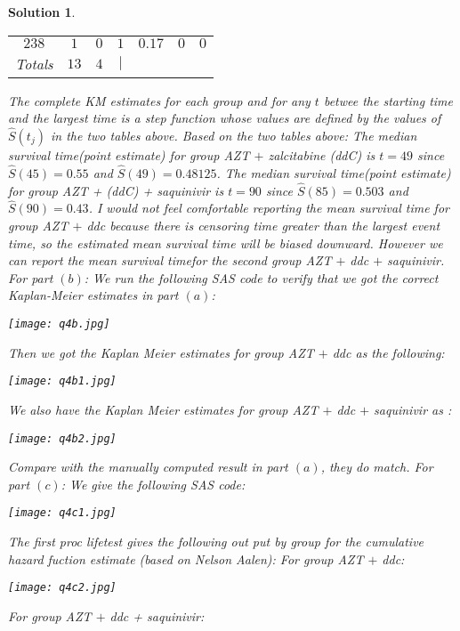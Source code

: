 \documentclass[11pt]{article}
\newtheorem{sol}{Solution}
\begin{document}
\begin{sol}
\begin{center}
\begin{tabular}{ccccccc}
		$238$& $1$& $0$& $1$ & $0.17$ & $0$ & $0$\\
		Totals& $13$& $4$& $|$\\
	\end{tabular}
	\end{center}
	The complete KM estimates for each group and for any $t$ betwee the starting time and the largest time is a step function whose values are defined by the values of $\hat{S}(t_j)$  in the two tables above.\vskip 2mm
	Based on the two tables above:\vskip 2mm
	The median survival time(point estimate) for group AZT $+$ zalcitabine (ddC) is $t = 49$ since $\hat{S}(45) = 0.55$ and $\hat{S}(49) = 0.48125$.\vskip 2mm
	The median survival time(point estimate) for group AZT + (ddC) + saquinivir is $t = 90$ since $\hat{S}(85) = 0.503$ and $\hat{S}(90) = 0.43$.\vskip 2mm
	I would not feel comfortable reporting the mean survival time for group AZT $+$ ddc because there is censoring time greater than the largest event time, so the estimated mean survival time will be biased downward.\vskip 2mm
	However we can report the mean survival timefor the second group AZT $+$ ddc $+$ saquinivir.\vskip 2mm
	For part $(b)$:\vskip 2mm
	We run the following SAS code to verify that we got the correct Kaplan-Meier estimates in part $(a)$:\vskip 2mm
	\begin{center}
		\texttt{[image: q4b.jpg]}
	\end{center}
	Then we got the Kaplan Meier estimates for group AZT $+$ ddc as the following:
	\begin{center}
		\texttt{[image: q4b1.jpg]}
	\end{center}
	We also have the Kaplan Meier estimates for group AZT $+$ ddc $+$ saquinivir as :
	\begin{center}
		\texttt{[image: q4b2.jpg]}
	\end{center}
	Compare with the manually computed result in part $(a)$, they do match.\vskip 2mm
	For part $(c)$:\vskip 2mm
	We give the following SAS code:
	\begin{center}
		\texttt{[image: q4c1.jpg]}
	\end{center}
	The first proc lifetest gives the following out put by group for the cumulative hazard fuction estimate (based on Nelson Aalen):\vskip 2mm
	For group AZT $+$ ddc:
	\begin{center}
		\texttt{[image: q4c2.jpg]}
	\end{center}
	For group AZT $+$ ddc + saquinivir:
	\begin{center}

\end{center}
\end{sol}
\end{document}
